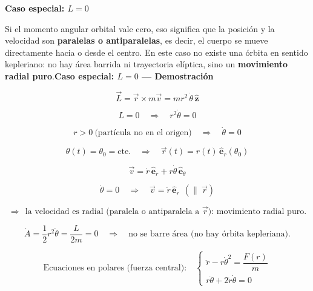 \documentclass{article}
\begin{document}
\textbf{Caso especial: $L = 0$}

Si el momento angular orbital vale cero, eso significa que la posición y la velocidad son 
\textbf{paralelas o antiparalelas}, es decir, el cuerpo se mueve directamente hacia o desde el centro. 
En este caso no existe una órbita en sentido kepleriano: no hay área barrida ni trayectoria elíptica, 
sino un \textbf{movimiento radial puro}.\textbf{Caso especial: $L=0$ — Demostración}

\begin{equation}
\vec{L}=\vec{r}\times m\vec{v}=m r^{2}\,\dot{\theta}\,\hat{\mathbf{z}}
\end{equation}

\begin{equation}
L=0 \quad\Rightarrow\quad r^{2}\dot{\theta}=0
\end{equation}

\begin{equation}
r>0 \ \text{(partícula no en el origen)} \quad\Rightarrow\quad \dot{\theta}=0
\end{equation}

\begin{equation}
\theta(t)=\theta_{0}=\text{cte.} \quad\Rightarrow\quad \vec{r}(t)=r(t)\,\hat{\mathbf{e}}_{r}(\theta_{0})
\end{equation}

\begin{equation}
\vec{v}=\dot{r}\,\hat{\mathbf{e}}_{r}+r\dot{\theta}\,\hat{\mathbf{e}}_{\theta}
\end{equation}

\begin{equation}
\dot{\theta}=0 \quad\Rightarrow\quad \vec{v}=\dot{r}\,\hat{\mathbf{e}}_{r}\ \ (\parallel\ \vec{r})
\end{equation}

\begin{equation}
\Rightarrow\ \ \text{la velocidad es radial (paralela o antiparalela a }\vec{r}\text{): movimiento radial puro.}
\end{equation}

\begin{equation}
\dot{A}=\frac{1}{2}r^{2}\dot{\theta}=\frac{L}{2m}=0 \quad\Rightarrow\quad \text{no se barre área (no hay órbita kepleriana).}
\end{equation}

\begin{equation}
\text{Ecuaciones en polares (fuerza central):}\quad
\begin{cases}
\ddot{r}-r\dot{\theta}^{2}=\dfrac{F(r)}{m}\\[6pt]
r\ddot{\theta}+2\dot{r}\dot{\theta}=0
\end{cases}
\end{equation}
\end{document}
